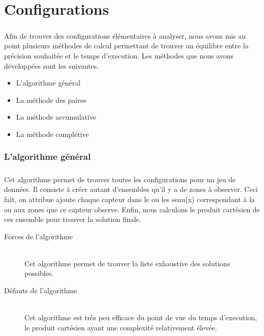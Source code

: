 \chapter{Configurations}

\paragraph{}
    Afin de trouver des configurations élémentaires à analyser, nous avons mis
    au point plusieurs méthodes de calcul permettant de trouver un équilibre
    entre la précision souhaitée et le temps d'execution.
    Les méthodes que nous avons développées sont les suivantes.
    \begin{itemize}
        \item L'algorithme général
        \item La méthode des paires
        \item La méthode accumulative
        \item La méthode complétive
    \end{itemize}

\subsection{L'algorithme général}
    \paragraph{}
    Cet algorithme permet de trouver toutes les configurations pour un jeu de
    données.
    Il consiste à créer autant d'ensembles qu'il y a de zones à observer.
    Ceci fait, on attribue ajoute chaque capteur dans le ou les seau(x)
    correspondant à la ou aux zones que ce capteur observe.
    Enfin, nous calculons le produit cartésien de ces ensemble pour trouver la
    solution finale.
    \begin{description}
        \item[Forces de l'algorithme]\hfill \\
            Cet algorithme permet de trouver la liste exhaustive des solutions
            possibles.
        \item[Défauts de l'algorithme]\hfill \\
            Cet algorithme est très peu efficace du point de vue du temps
            d'execution, le produit cartésien ayant une complexité relativement
            élevée.
    \end{description}

